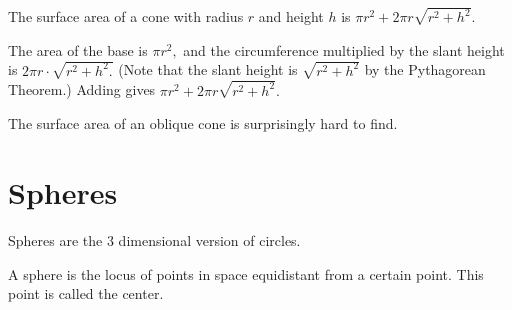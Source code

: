 \documentclass[mast]{lucky}
\begin{document}
\begin{center}
    \hspace{1.5cm}
\end{center}

\begin{theo}
The surface area of a cone with radius $r$ and height $h$ is $\pi r^2+2\pi r\sqrt{r^2+h^2}.$
\end{theo}

\begin{pro}
The area of the base is $\pi r^2,$ and the circumference multiplied by the slant height is $2\pi r\cdot \sqrt{r^2+h^2.}$ (Note that the slant height is $\sqrt{r^2+h^2}$ by the Pythagorean Theorem.) Adding gives $\pi r^2+2\pi r\sqrt{r^2+h^2}.$
\end{pro}

The surface area of an oblique cone is surprisingly hard to find.
\section{Spheres}
Spheres are the $3$ dimensional version of circles.
\begin{defi}[Sphere]
A sphere is the locus of points in space equidistant from a certain point. This point is called the center.
\end{defi}
\end{document}
